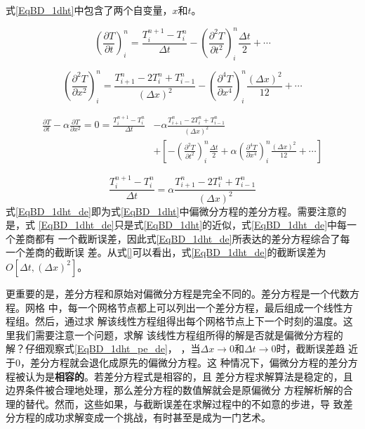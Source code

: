 式\eqref{EqBD_1dht}中包含了两个自变量，$x$和$t$。

\begin{equation}
  \left(
    \frac{\partial T}{\partial t}
  \right)_{i}^{n}
  =
  \frac{T_{i}^{n+1}-T_{i}^{n}}{\Delta t}
  -
  \left(
    \frac{\partial^{2} T}{\partial t^{2}}
  \right)_{i}^{n}
  \frac{\Delta t}{2}
  +
  \cdots
\end{equation}

\begin{equation}
  \left(
    \frac{\partial^{2} T}{\partial x^{2}}
  \right)_{i}^{n}
  =
  \frac{T_{i+1}^{n}-2T_{i}^{n}+T_{i-1}^{n}}{(\Delta x)^2}
  -
  \left(
    \frac{\partial^{4} T}{\partial x^{4}}
  \right)_{i}^{n}
  \frac{(\Delta x)^{2}}{12}
  +
  \cdots
\end{equation}

\begin{equation}
  \begin{aligned}
    \frac{\partial T}{\partial t}
    -
    \alpha
    \frac{\partial T}{\partial x^{2}}
    =
    0
    =
    \frac{T_{i}^{n+1}-T_{i}^{n}}{\Delta t}
    &-
    \alpha\frac{T_{i+1}^{n}-2T_{i}^{n}+T_{i-1}^{n}}{(\Delta x)^2}
    \\
    &+
    \left[
      -
      \left(
        \frac{\partial^{2} T}{\partial t^{2}}
      \right)_{i}^{n}
      \frac{\Delta t}{2}
      +
      \alpha
      \left(
        \frac{\partial^{4} T}{\partial x^{4}}
      \right)_{i}^{n}
      \frac{(\Delta x)^{2}}{12}
      +
      \cdots
    \right]
  \end{aligned}
  \label{EqBD_1dht_pe_de}
\end{equation}

\begin{equation}
    \frac{T_{i}^{n+1}-T_{i}^{n}}{\Delta t}
    =
    \alpha\frac{T_{i+1}^{n}-2T_{i}^{n}+T_{i-1}^{n}}{(\Delta x)^2}
    \label{EqBD_1dht_de}
\end{equation}
式\eqref{EqBD_1dht_de}即为式\eqref{EqBD_1dht}中偏微分方程的差分方程。需要注意的是，式
\eqref{EqBD_1dht_de}只是式\eqref{EqBD_1dht}的近似，式\eqref{EqBD_1dht_de}中每一个差商都有
一个截断误差，因此式\eqref{EqBD_1dht_de}所表达的差分方程综合了每一个差商的截断误
差。从式\eqref{}可以看出，式\eqref{EqBD_1dht_de}的截断误差为$O[\Delta t, (\Delta
x)^{2}]$。

更重要的是，差分方程和原始对偏微分方程是完全不同的。差分方程是一个代数方程。网格
中，每一个网格节点都上可以列出一个差分方程，最后组成一个线性方程组。然后，通过求
解该线性方程组得出每个网格节点上下一个时刻的温度。这里我们需要注意一个问题，求解
该线性方程组所得的解是否就是偏微分方程的解？仔细观察式\eqref{EqBD_1dht_pe_de}，
，当$\Delta x \rightarrow 0$和$\Delta t \rightarrow 0$时，截断误差趋
近于0，差分方程就会退化成原先的偏微分方程。这
种情况下，偏微分方程的差分方程被认为是\textbf{相容的}。若差分方程式是相容的，且
差分方程求解算法是稳定的，且边界条件被合理地处理，那么差分方程的数值解就会是原偏微分
方程解析解的合理的替代。然而，这些如果，与截断误差在求解过程中的不如意的步进，导
致差分方程的成功求解变成一个挑战，有时甚至是成为一门艺术。

